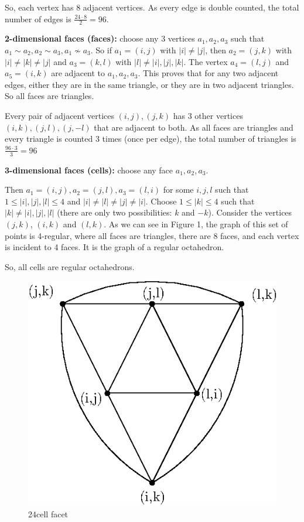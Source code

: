 \documentclass[paper=a4, fontsize=11pt]{scrartcl} %
\theoremstyle{plain}
\begin{document}
So, each vertex has 8 adjacent vertices. As every edge is double counted, the total number of edges is $\frac{24 \cdot 8}{2} = 96$.

\textbf{2-dimensional faces (faces):} choose any 3 vertices $a_1,a_2,a_3$ such that $a_1 \sim a_2, a_2 \sim a_3, a_1 \nsim a_3$.
So if $a_1 = (i,j)$ with $\vert i \vert \neq \vert j \vert$, then $a_2 = (j,k)$ with $\vert i \vert \neq \vert k \vert \neq \vert j \vert$ and $a_3 = (k,l)$ with $\vert l \vert \neq \vert i \vert, \vert j \vert, \vert k \vert$. The vertex $a_4=(l,j)$ and $a_5=(i,k)$ are adjacent to $a_1,a_2,a_3$. This proves that for any two adjacent edges, either they are in the same triangle, or they are in two adjacent triangles. So all faces are triangles.

Every pair of adjacent vertices $(i,j),(j,k)$ has 3 other vertices $(i,k),(j,l),(j,-l)$ that are adjacent to both. As all faces are triangles and every triangle is counted 3 times (once per edge), the total number of triangles is $\frac{96 \cdot 3}{3} = 96$ 

\textbf{3-dimensional faces (cells):} choose any face $a_1,a_2,a_3$.

Then $a_1 = (i,j), a_2=(j,l), a_3=(l,i)$ for some $i,j,l$ such that $1 \leq \vert i \vert, \vert j \vert, \vert l \vert \leq 4$ and $\vert i \vert \neq \vert l \vert \neq \vert j \vert \neq \vert i \vert$. Choose $ 1 \leq \vert k \vert \leq 4 $ such that $\vert k \vert \neq \vert i \vert, \vert j \vert, \vert l \vert$ (there are only two possibilities: $k$ and $-k$). Consider the vertices $(j,k)$, $(i,k)$ and $(l,k)$. As we can see in Figure 1, the graph of this set of points is 4-regular, where all faces are triangles, there are 8 faces, and each vertex is incident to 4 faces. It is the graph of a regular octahedron.

So, all cells are regular octahedrons.

\begin{figure}[!htb]
\centering
\includegraphics[scale=0.8]{figures/facet.eps}
\caption{24cell facet}
\label{fig:face}
\end{figure}
\end{document}
